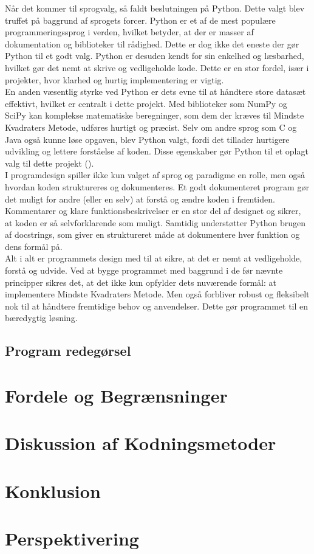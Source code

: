 Når det kommer til sprogvalg, så faldt beslutningen på Python. Dette valgt blev truffet på baggrund af sprogets forcer. Python er et af de mest populære programmeringssprog i verden, hvilket betyder, at der er masser af dokumentation og biblioteker til rådighed. Dette er dog ikke det eneste der gør Python til et godt valg. Python er desuden kendt for sin enkelhed og læsbarhed, hvilket gør det nemt at skrive og vedligeholde kode. Dette er en stor fordel, især i projekter, hvor klarhed og hurtig implementering er vigtig. \\
En anden væsentlig styrke ved Python er dets evne til at håndtere store datasæt effektivt, hvilket er centralt i dette projekt. Med biblioteker som NumPy og SciPy kan komplekse matematiske beregninger, som dem der kræves til Mindste Kvadraters Metode, udføres hurtigt og præcist. Selv om andre sprog som C og Java også kunne løse opgaven, blev Python valgt, fordi det tillader hurtigere udvikling og lettere forståelse af koden. Disse egenskaber gør Python til et oplagt valg til dette projekt (\cite{simplilearn}). \\
I programdesign spiller ikke kun valget af sprog og paradigme en rolle, men også hvordan koden struktureres og dokumenteres. Et godt dokumenteret program gør det muligt for andre (eller en selv) at forstå og ændre koden i fremtiden. Kommentarer og klare funktionsbeskrivelser er en stor del af designet og sikrer, at koden er så selvforklarende som muligt. Samtidig understøtter Python brugen af docstrings, som giver en struktureret måde at dokumentere hver funktion og dens formål på.\\ 
Alt i alt er programmets design med til at sikre, at det er nemt at vedligeholde, forstå og udvide. Ved at bygge programmet med baggrund i de før nævnte principper sikres det, at det ikke kun opfylder dets nuværende formål: at implementere Mindste Kvadraters Metode. Men også forbliver robust og fleksibelt nok til at håndtere fremtidige behov og anvendelser. Dette gør programmet til en bæredygtig løsning.

\subsection{Program redegørsel}

\section{Fordele og Begrænsninger}\label{sec:fordeleOgBegrensninger}

\section{Diskussion af Kodningsmetoder}\label{sec:Kodningsmetoder}

\section{Konklusion}

\section{Perspektivering}
